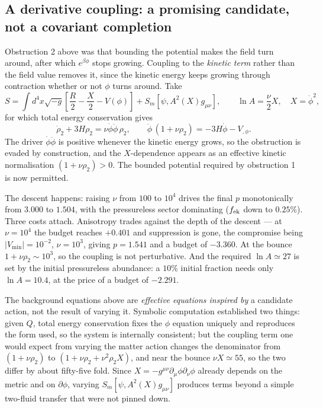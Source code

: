 \documentclass[a4paper,11pt]{article}
\begin{document}
\subsection{A derivative coupling: a promising candidate, not a covariant completion}

Obstruction 2 above was that bounding the potential makes the field turn around, after which $e^{\beta\phi}$ stops growing. Coupling to the \emph{kinetic term} rather than the field value removes it, since the kinetic energy keeps growing through contraction whether or not $\phi$ turns around. Take
\begin{equation}
S=\int d^4x\sqrt{-g}\left[\frac{R}{2}-\frac{X}{2}-V(\phi)\right]+S_m[\psi,A^2(X)g_{\mu\nu}],\qquad \ln A=\frac{\nu}{2}X,\quad X=\dot\phi^2 ,
\end{equation}
for which total energy conservation gives
\begin{equation}
\dot\rho_2+3H\rho_2=\nu\dot\phi\ddot\phi\,\rho_2,\qquad \ddot\phi\,(1+\nu\rho_2)=-3H\dot\phi-V_{,\phi} .
\end{equation}
The driver $\dot\phi\ddot\phi$ is positive whenever the kinetic energy grows, so the obstruction is evaded by construction, and the $X$-dependence appears as an effective kinetic normalisation $(1+\nu\rho_2)>0$. The bounded potential required by obstruction 1 is now permitted.

The descent happens: raising $\nu$ from $100$ to $10^4$ drives the final $p$ monotonically from $3.000$ to $1.504$, with the pressureless sector dominating ($f_{\rm ek}$ down to $0.25\%$). Three costs attach. Anisotropy trades against the depth of the descent --- at $\nu=10^4$ the budget reaches $+0.401$ and suppression is gone, the compromise being $|V_{\min}|=10^{-2}$, $\nu=10^3$, giving $p=1.541$ and a budget of $-3.360$. At the bounce $1+\nu\rho_2\sim10^3$, so the coupling is not perturbative. And the required $\ln A\simeq27$ is set by the initial pressureless abundance: a $10\%$ initial fraction needs only $\ln A=10.4$, at the price of a budget of $-2.291$.

The background equations above are \emph{effective equations inspired by} a candidate action, not the result of varying it. Symbolic computation established two things: given $Q$, total energy conservation fixes the $\phi$ equation uniquely and reproduces the form used, so the system is internally consistent; but the coupling term one would expect from varying the matter action changes the denominator from $(1+\nu\rho_2)$ to $(1+\nu\rho_2+\nu^2\rho_2X)$, and near the bounce $\nu X\simeq55$, so the two differ by about fifty-five fold. Since $X=-g^{\mu\nu}\partial_\mu\phi\partial_\nu\phi$ already depends on the metric and on $\partial\phi$, varying $S_m[\psi,A^2(X)g_{\mu\nu}]$ produces terms beyond a simple two-fluid transfer that were not pinned down.
\end{document}
